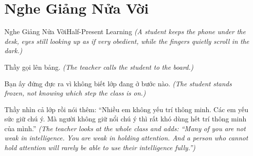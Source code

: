 \section{Nghe Giảng Nửa Vời}
\begin{truyen}{Nghe Giảng Nửa Vời}{Half-Present Learning}
\textit{(A student keeps the phone under the desk, eyes still looking up as if very obedient, while the fingers quietly scroll in the dark.)}

Thầy gọi lên bảng.
\textit{(The teacher calls the student to the board.)}

Bạn ấy đứng đực ra vì không biết lớp đang ở bước nào.
\textit{(The student stands frozen, not knowing which step the class is on.)}


Thầy nhìn cả lớp rồi nói thêm: ``Nhiều em không yếu trí thông minh. Các em yếu sức giữ chú ý. Mà người không giữ nổi chú ý thì rất khó dùng hết trí thông minh của mình.''
\textit{(The teacher looks at the whole class and adds: ``Many of you are not weak in intelligence. You are weak in holding attention. And a person who cannot hold attention will rarely be able to use their intelligence fully.'')}
\end{truyen}

